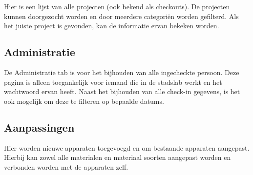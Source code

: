 Hier is een lijst van alle projecten (ook bekend als checkouts). De projecten kunnen doorgezocht worden en door meerdere categori\"en worden gefilterd. Als het juiste project is gevonden, kan de informatie ervan bekeken worden.

\subsection{Administratie}
De Administratie tab is voor het bijhouden van alle ingecheckte persoon. Deze pagina is alleen toegankelijk voor iemand die in de stadslab werkt en het wachtwoord ervan heeft. Naast het bijhouden van alle check-in gegevens, is het ook mogelijk om deze te filteren op bepaalde datums.

\subsection{Aanpassingen}
Hier worden nieuwe apparaten toegevoegd en om bestaande apparaten aangepast. Hierbij kan zowel alle materialen en materiaal soorten aangepast worden en verbonden worden met de apparaten zelf.
